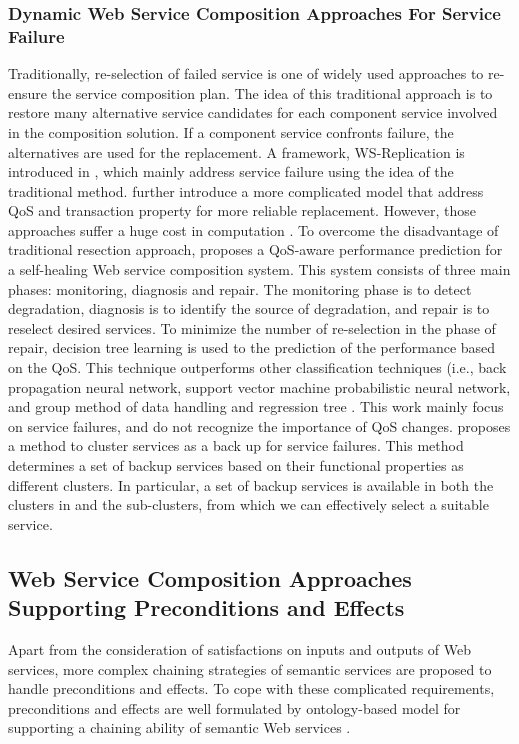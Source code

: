 \subsubsection{Dynamic Web Service Composition Approaches For Service Failure}\label{dynamicService}
Traditionally, re-selection of failed service is one of widely used approaches to re-ensure the  service composition plan. The idea of this traditional approach is to restore many alternative service candidates for each component service involved in the composition solution. If a component service confronts failure, the alternatives are used for the replacement.  A framework, WS-Replication is introduced in \cite{salas2006ws}, which mainly address service failure using the idea of the traditional method. \cite{yin2010qos} further introduce a more complicated model that address QoS and transaction property for more reliable replacement. However, those approaches \cite{salas2006ws,yin2010qos} suffer a huge cost in computation \cite{nasridinov2012qos}. To overcome the disadvantage of traditional resection approach, \cite{nasridinov2012qos} proposes a QoS-aware performance prediction for a self-healing Web service composition system. This system consists of three main phases: monitoring, diagnosis and repair. The monitoring phase is to detect degradation, diagnosis is to identify the source of degradation, and repair is to reselect desired services. To minimize the number of re-selection in the phase of repair, decision tree learning is used to the prediction of the performance based on the QoS. This technique outperforms other classification techniques (i.e., back propagation neural network, support vector machine probabilistic neural network, and group method of data handling and regression tree \cite{mohanty2010Web}.  This work mainly focus on service failures, and do not recognize the importance of  QoS changes. \cite{wagner2016robust} proposes a method to cluster services as a back up for service failures. This method determines a set of backup services based on their functional properties as different clusters. In particular, a set of backup services is available in both the clusters in and the sub-clusters, from which we can effectively select a suitable service.


\subsection{Web Service Composition Approaches Supporting Preconditions and Effects}\label{Semantic}
Apart from the consideration of satisfactions on inputs and outputs of Web services, more complex chaining strategies of semantic services are proposed to handle preconditions and effects. To cope with these complicated requirements, preconditions and effects are well formulated by ontology-based model for supporting a chaining ability of semantic Web services \cite{wang2014automated}.

